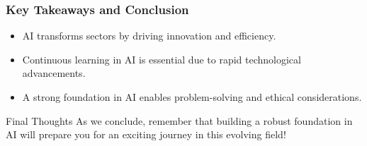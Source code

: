 \documentclass[aspectratio=169]{beamer}
\begin{document}
\begin{frame}[fragile]
    \frametitle{Key Takeaways and Conclusion}
    \begin{itemize}
        \item AI transforms sectors by driving innovation and efficiency.
        \item Continuous learning in AI is essential due to rapid technological advancements.
        \item A strong foundation in AI enables problem-solving and ethical considerations.
    \end{itemize}

    \begin{block}{Final Thoughts}
        As we conclude, remember that building a robust foundation in AI will prepare you for an exciting journey in this evolving field!
    \end{block}
\end{frame}
\end{document}
